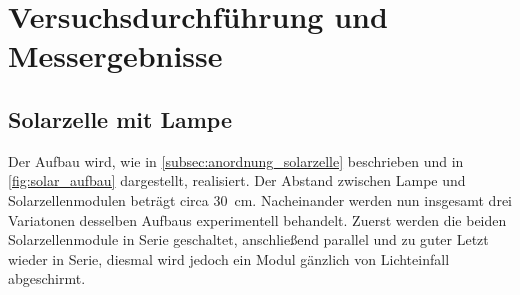 \documentclass[english, ngerman]{scrartcl}
\begin{document}
\section{Versuchsdurchführung und Messergebnisse}
\label{sec:versuchsdurchfuehrung_messergebnisse}

\subsection{Solarzelle mit Lampe}
\label{subsec:durchfuehrung_solar_lampe}
Der Aufbau wird, wie in \autoref{subsec:anordnung_solarzelle} beschrieben und in \autoref{fig:solar_aufbau} dargestellt, realisiert. Der Abstand zwischen Lampe und Solarzellenmodulen beträgt circa \SI{30}{cm}. Nacheinander werden nun insgesamt drei Variatonen desselben Aufbaus experimentell behandelt. Zuerst werden die beiden Solarzellenmodule in Serie geschaltet, anschließend parallel und zu guter Letzt wieder in Serie, diesmal wird jedoch ein Modul gänzlich von Lichteinfall abgeschirmt.
\end{document}
